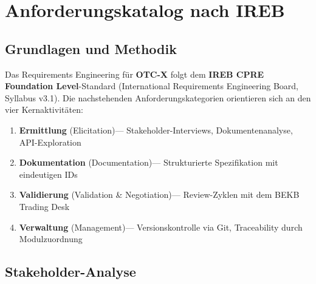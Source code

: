 \documentclass[12pt, a4paper, oneside]{report}
\newcommand{\term}[1]{\textcolor{swissred}{\textsf{\textbf{#1}}}}
\begin{document}
\chapter{Anforderungskatalog nach IREB}
\label{ch:requirements}

\section{Grundlagen und Methodik}

Das Requirements Engineering f\"ur \term{OTC-X} folgt dem \textbf{IREB CPRE Foundation Level}-Standard (International Requirements Engineering Board, Syllabus v3.1). Die nachstehenden Anforderungskategorien orientieren sich an den vier Kernaktivit\"aten:

\begin{enumerate}[label=\textcolor{swissred}{\textbf{\arabic*.}}]
  \item \textbf{Ermittlung} (Elicitation)\;--- Stakeholder-Interviews, Dokumentenanalyse, API-Exploration
  \item \textbf{Dokumentation} (Documentation)\;--- Strukturierte Spezifikation mit eindeutigen IDs
  \item \textbf{Validierung} (Validation \& Negotiation)\;--- Review-Zyklen mit dem BEKB Trading Desk
  \item \textbf{Verwaltung} (Management)\;--- Versionskontrolle via Git, Traceability durch Modulzuordnung
\end{enumerate}

\section{Stakeholder-Analyse}
\end{document}
